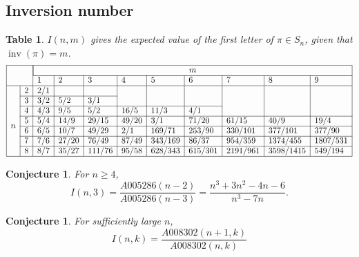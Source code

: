 \documentclass{article}
\newcommand{\n}[1]{\multicolumn{1}{|c|}{#1}}
\newtheorem{conjecture}[theo]{Conjecture}
\newtheorem{datatable}[theo]{Table}
\begin{document}
\subsection{Inversion number}
\begin{datatable} $I(n, m)$ gives the expected value of the first letter of
  $\pi \in S_n$, given that $\operatorname{inv}(\pi) = m$.
\[
  \begin{array}{|ll|l|l|l|l|l|l|l|l|l|}
  \hline
  & & \multicolumn{9}{|c|}{m} \\ \cline{3-11}
  & & 1 & 2 & 3 & 4 & 5 & 6 & 7 & 8 & 9\\ \hline
  \multirow{8}{*}{$n$}
  & \n{2} & 2/1 &       &        &       &         &         &          &           &          \\ \cline{2-5}
  & \n{3} & 3/2 & 5/2   & 3/1    &       &         &         &          &           &          \\ \cline{2-8}
  & \n{4} & 4/3 & 9/5   & 5/2    & 16/5  & 11/3    & 4/1     &          &           &          \\ \cline{2-11}
  & \n{5} & 5/4 & 14/9  & 29/15  & 49/20 & 3/1     & 71/20   & 61/15    & 40/9      & 19/4     \\ \cline{2-11}
  & \n{6} & 6/5 & 10/7  & 49/29  & 2/1   & 169/71  & 253/90  & 330/101  & 377/101   & 377/90   \\ \cline{2-11}
  & \n{7} & 7/6 & 27/20 & 76/49  & 87/49 & 343/169 & 86/37   & 954/359  & 1374/455  & 1807/531 \\ \cline{2-11}
  & \n{8} & 8/7 & 35/27 & 111/76 & 95/58 & 628/343 & 615/301 & 2191/961 & 3598/1415 & 549/194  \\ \hline
  \end{array}
\]
\end{datatable}
\begin{conjecture}
  For $n \geq 4$,
  \[
    I(n,3) = \frac{A005286(n-2)}{A005286(n-3)} = \frac{n^3 + 3 n^2 - 4 n - 6}{n^3 - 7 n}.
  \]
\end{conjecture}
\begin{conjecture}
  For sufficiently large $n$,
  \[
    I(n,k) = \frac{A008302(n + 1, k)}{A008302(n, k)}
  \]
\end{conjecture}
\end{document}
